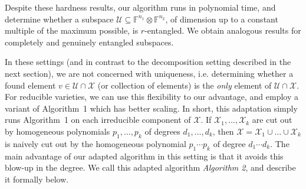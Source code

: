 \documentclass[11pt]{article}
\theoremstyle{definition}
\newcommand{\field}{\mathbb{F}}
\newcommand\X{\mathcal{X}}
\newcommand\U{\mathcal{U}}
\begin{document}
Despite these hardness results, our algorithm runs in polynomial time, and determine whether a subspace $\U\subseteq \field^{n_1}\otimes \field^{n_2}$, of dimension up to a constant multiple of the maximum possible, is $r$-entangled. We obtain analogous results for completely and genuinely entangled subspaces.

In these settings (and in contrast to the decomposition setting described in the next section), we are not concerned with uniqueness, i.e. determining whether a found element $v \in \U\cap \X$ (or collection of elements) is the \textit{only} element of $\U\cap \X$. For reducible varieties, we can use this flexibility to our advantage, and employ a variant of Algorithm~1 which has better scaling. In short, this adaptation simply runs Algorithm~1 on each irreducible component of $\X$. If $\X_1,\dots, \X_k$ are cut out by homogeneous polynomials $p_1,\dots, p_k$ of degrees $d_1,\ldots, d_k$, then $\X=\X_1 \cup \dots \cup \X_k$ is naively cut out by the homogeneous polynomial $p_1\cdots p_k$ of degree $d_1\cdots d_k$. The main advantage of our adapted algorithm in this setting is that it avoids this blow-up in the degree. We call this adapted algorithm \textit{Algorithm 2}, and describe it formally below.
\end{document}

